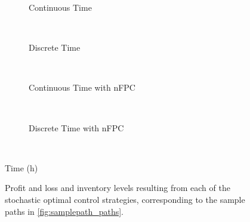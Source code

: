\begin{figure}%
\centering%
\setlength{}%
\setlength{}%
\begin{subfigure}[b]{\linewidth}%
  \centering%
  \hspace{1.5cm}%
  \caption{Continuous Time}%
\end{subfigure}\\%
\vspace{1cm}%
\begin{subfigure}[b]{\linewidth}%
  \centering
  \hspace{1.5cm}%
  \caption{Discrete Time}%
\end{subfigure}\\%
\vspace{1cm}%
\begin{subfigure}[b]{\linewidth}%
  \centering%
  \hspace{1.5cm}%
  \caption{Continuous Time with nFPC}%
\end{subfigure}\\%
\vspace{1cm}%
\begin{subfigure}[b]{\linewidth}%
  \centering%
  \hspace{1.5cm}%
  \caption{Discrete Time with nFPC}%
\end{subfigure}\\%
\leavevmode{}\hspace{0pt plus 1filll}\null%

Time (h)

\vspace{1cm}%
  \caption[Comparison of P\&L and inventory on the sample path]{Profit and loss and inventory levels resulting from each of the stochastic optimal control strategies, corresponding to the sample paths in \autoref{fig:samplepath_paths}.}\label{fig:samplepath_pnl_inv}%
\end{figure}

